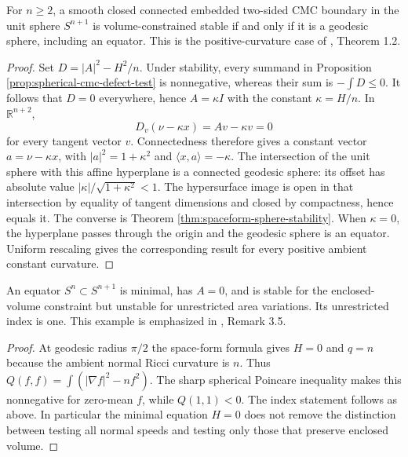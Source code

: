 \begin{theorem}\label{thm:spherical-cmc-stability-rigidity}
For $n\geq2$, a smooth closed connected embedded two-sided CMC boundary in the unit sphere $S^{n+1}$ is volume-constrained stable if and only if it is a geodesic sphere, including an equator. This is the positive-curvature case of \cite{BdCE88}, Theorem 1.2.
\end{theorem}
\begin{proof}
Set $D=|A|^2-H^2/n$. Under stability, every summand in Proposition \ref{prop:spherical-cmc-defect-test} is nonnegative, whereas their sum is $-\int D\leq0$. It follows that $D=0$ everywhere, hence $A=\kappa I$ with the constant $\kappa=H/n$. In $\mathbb R^{n+2}$,
\[
 D_v(\nu-\kappa x)=Av-\kappa v=0
\]
for every tangent vector $v$. Connectedness therefore gives a constant vector $a=\nu-\kappa x$, with $|a|^2=1+\kappa^2$ and $\langle x,a\rangle=-\kappa$. The intersection of the unit sphere with this affine hyperplane is a connected geodesic sphere: its offset has absolute value $|\kappa|/\sqrt{1+\kappa^2}<1$. The hypersurface image is open in that intersection by equality of tangent dimensions and closed by compactness, hence equals it. The converse is Theorem \ref{thm:spaceform-sphere-stability}. When $\kappa=0$, the hyperplane passes through the origin and the geodesic sphere is an equator. Uniform rescaling gives the corresponding result for every positive ambient constant curvature.
\end{proof}

\begin{example}\label{ex:equator-constrained-stability}
An equator $S^n\subset S^{n+1}$ is minimal, has $A=0$, and is stable for the enclosed-volume constraint but unstable for unrestricted area variations. Its unrestricted index is one. This example is emphasized in \cite{BdCE88}, Remark 3.5.
\end{example}
\begin{proof}
At geodesic radius $\pi/2$ the space-form formula gives $H=0$ and $q=n$ because the ambient normal Ricci curvature is $n$. Thus $Q(f,f)=\int(|\nabla f|^2-nf^2)$. The sharp spherical Poincare inequality makes this nonnegative for zero-mean $f$, while $Q(1,1)<0$. The index statement follows as above. In particular the minimal equation $H=0$ does not remove the distinction between testing all normal speeds and testing only those that preserve enclosed volume.
\end{proof}


